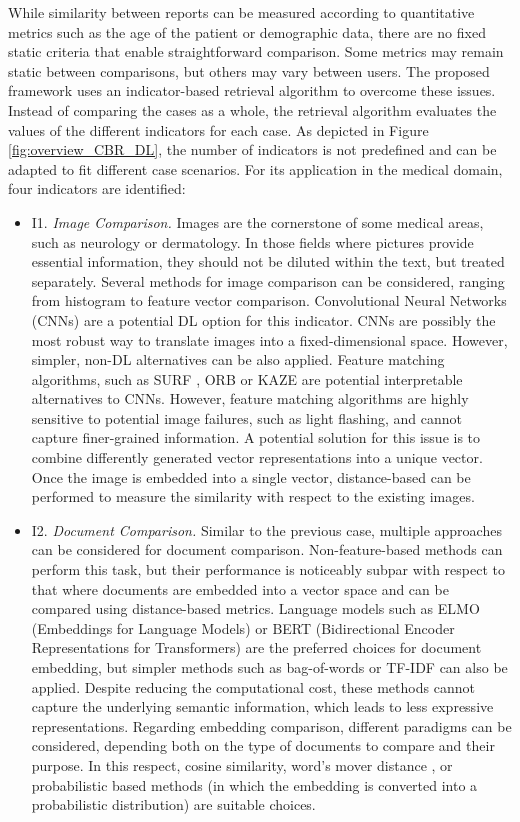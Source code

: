 While similarity between reports can be measured according to quantitative metrics such as the age of the patient or demographic data, there are no fixed static criteria that enable straightforward comparison. Some metrics may remain static between comparisons, but others may vary between users. The proposed framework uses an indicator-based retrieval algorithm to overcome these issues. Instead of comparing the cases as a whole, the retrieval algorithm evaluates the values of the different indicators for each case. As depicted in Figure \ref{fig:overview_CBR_DL}, the number of indicators is not predefined and can be adapted to fit different case scenarios. For its application in the medical domain, four indicators are identified:
\begin{itemize}
    \item I1. \textit{Image Comparison.} Images are the cornerstone of some medical areas, such as neurology or dermatology. In those fields where pictures provide essential information, they should not be diluted within the text, but treated separately. Several methods for image comparison can be considered, ranging from histogram to feature vector comparison. Convolutional Neural Networks (CNNs) are a potential DL option for this indicator. CNNs are possibly the most robust way to translate images into a fixed-dimensional space. However, simpler, non-DL alternatives can be also applied. Feature matching algorithms, such as SURF \citep{image_surf}, ORB \citep{ORB_image} or KAZE \citep{KAZE_images} are potential interpretable alternatives to CNNs. However, feature matching algorithms are highly sensitive to potential image failures, such as light flashing, and cannot capture finer-grained information. A potential solution for this issue is to combine differently generated vector representations into a unique vector. Once the image is embedded into a single vector, distance-based can be performed to measure the similarity with respect to the existing images.
    
    \item I2. \textit{Document Comparison.} Similar to the previous case, multiple approaches can be considered for document comparison. Non-feature-based methods can perform this task, but their performance is noticeably subpar with respect to that where documents are embedded into a vector space and can be compared using distance-based metrics. Language models such as ELMO (Embeddings for Language Models) \citep{elmo} or BERT (Bidirectional Encoder Representations for Transformers) \citep{bert} are the preferred choices for document embedding, but simpler methods such as bag-of-words or TF-IDF can also be applied. Despite reducing the computational cost, these methods cannot capture the underlying semantic information, which leads to less expressive representations. Regarding embedding comparison, different paradigms can be considered, depending both on the type of documents to compare and their purpose. In this respect, cosine similarity, word's mover distance \citep{word_mover_distance}, or probabilistic based methods (in which the embedding is converted into a probabilistic distribution) are suitable choices.
    

\end{itemize}
